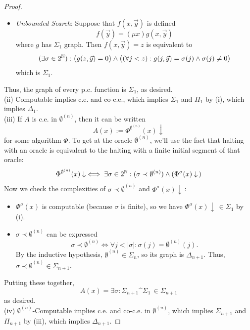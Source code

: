 \documentclass{amsart}
\begin{document}
\begin{proof}
\begin{itemize}
			which is $\Sigma_1$.
			\item \textit{Unbounded Search}: Suppose that $f(x,\vec{y})$ is defined
			$$f(\vec{y})= (\mu x) g(x,\vec{y})$$
			where $g$ has $\Sigma_1$ graph. Then $f(x,\vec{y})=z$ is equivalent to
			$$
			(\exists \sigma \in 2^{\mathbb{N}}): {\big(g(z,\vec{y})=0\big)}\wedge \big((\forall j < z): g(j,\vec{y}) = \sigma(j) \wedge \sigma(j)\neq 0\big)
			$$
			which is $\Sigma_1$.
		\end{itemize}
		Thus, the graph of every p.c. function is $\Sigma_1$, as desired.\\
		
		(ii) Computable implies c.e. and co-c.e., which implies $\Sigma_1$ and $\Pi_1$ by (i), which implies $\Delta_1$.\\
		
		(iii) If $A$ is c.e. in $\emptyset^{(n)}$, then it can be written 
		$$
		A(x) := \Phi^{\emptyset^{(n)}}(x) \downarrow
		$$
		for some algorithm $\Phi$. To get at the oracle $\emptyset^{(n)}$, we'll use the fact that halting with an oracle is equivalent to the halting with a finite initial segment of that oracle:
		$$
		\Phi^{\emptyset^{(n)}}(x)\downarrow \iff \exists \sigma\in 2^{\mathbb{N}}: (\sigma \prec \emptyset^{(n)}) \wedge (\Phi^{\sigma}(x)\downarrow\,) 
		$$
		Now we check the complexities of $\sigma\prec \emptyset^{(n)}$ and $\Phi^{\sigma}(x)\downarrow\,$:
		\begin{itemize}\item $\Phi^{\sigma}(x)$ is computable (because $\sigma$ is finite), so we have $\Phi^{\sigma}(x)\downarrow\,\in \Sigma_1$ by (i).
			\item $\sigma \prec \emptyset^{(n)}$ can be expressed
			$$
			\sigma \prec \emptyset^{(n)} \iff \forall j < |\sigma|: \sigma(j)=\emptyset^{(n)}(j).
			$$
			By the inductive hypothesis, $\emptyset^{(n)}\in \Sigma_n$, so its graph is $\Delta_{n+1}$. Thus, $\sigma\prec \emptyset^{(n)}\in \Sigma_{n+1}$.
		\end{itemize}
		\indent Putting these together, 
		$$
		A(x) = \exists \sigma : \Sigma_{n+1} \^ \Sigma_1 \, \in \Sigma_{n+1}
		$$
		as desired.\\
		
		(iv) $\emptyset^{(n)}$-Computable implies c.e. and co-c.e. in $\emptyset^{(n)}$, which implies $\Sigma_{n+1}$ and $\Pi_{n+1}$ by (iii), which implies $\Delta_{n+1}$.
	\end{proof}\\
	
\end{document}

